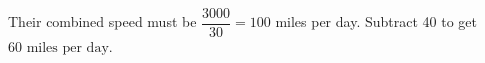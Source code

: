 Their combined speed must be $\dfrac{3000}{30}=100$ miles per day. Subtract 40 to get $\boxed{60\text{ miles per day}}$.
